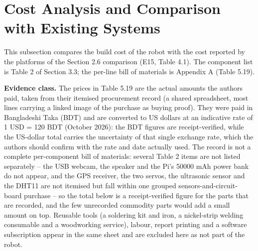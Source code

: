 \section{Cost Analysis and Comparison with Existing Systems}

This subsection compares the build cost of the robot with the cost reported by the platforms of the Section 2.6 comparison (E15, Table 4.1). The component list is Table 2 of Section 3.3; the per-line bill of materials is Appendix A (Table 5.19).

\textbf{Evidence class.} The prices in Table 5.19 are the actual amounts the authors paid, taken from their itemised procurement record (a shared spreadsheet, most lines carrying a linked image of the purchase as buying proof). They were paid in Bangladeshi Taka (BDT) and are converted to US dollars at an indicative rate of 1 USD = 120 BDT (October 2026): the BDT figures are receipt-verified, while the US-dollar total carries the uncertainty of that single exchange rate, which the authors should confirm with the rate and date actually used. The record is not a complete per-component bill of materials: several Table 2 items are not listed separately -- the USB webcam, the speaker and the Pi's 50000 mAh power bank do not appear, and the GPS receiver, the two servos, the ultrasonic sensor and the DHT11 are not itemised but fall within one grouped sensors-and-circuit-board purchase -- so the total below is a receipt-verified figure for the parts that are recorded, and the few unrecorded commodity parts would add a small amount on top. Reusable tools (a soldering kit and iron, a nickel-strip welding consumable and a woodworking service), labour, report printing and a software subscription appear in the same sheet and are excluded here as not part of the robot.


